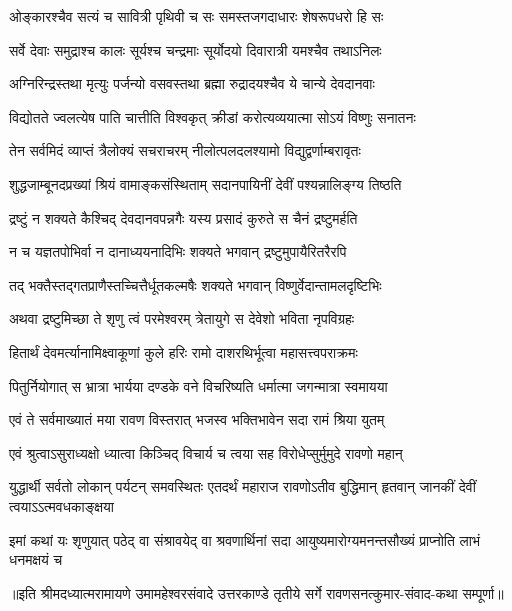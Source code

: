 \twolineshloka
{ओङ्कारश्चैव सत्यं च सावित्री पृथिवी च सः}
{समस्तजगदाधारः शेषरूपधरो हि सः} %

\twolineshloka
{सर्वे देवाः समुद्राश्च कालः सूर्यश्च चन्द्रमाः}
{सूर्योदयो दिवारात्री यमश्चैव तथाऽनिलः} %

\twolineshloka
{अग्निरिन्द्रस्तथा मृत्युः पर्जन्यो वसवस्तथा}
{ब्रह्मा रुद्रादयश्चैव ये चान्ये देवदानवाः} %

\twolineshloka
{विद्योतते ज्वलत्येष पाति चात्तीति विश्वकृत्}
{क्रीडां करोत्यव्ययात्मा सोऽयं विष्णुः सनातनः} %

\twolineshloka
{तेन सर्वमिदं व्याप्तं त्रैलोक्यं सचराचरम्}
{नीलोत्पलदलश्यामो विद्युद्वर्णाम्बरावृतः} %

\twolineshloka
{शुद्धजाम्बूनदप्रख्यां श्रियं वामाङ्कसंस्थिताम्}
{सदानपायिनीं देवीं पश्यन्नालिङ्ग्य तिष्ठति} %

\twolineshloka
{द्रष्टुं न शक्यते कैश्चिद् देवदानवपन्नगैः}
{यस्य प्रसादं कुरुते स चैनं द्रष्टुमर्हति} %

\twolineshloka
{न च यज्ञतपोभिर्वा न दानाध्ययनादिभिः}
{शक्यते भगवान् द्रष्टुमुपायैरितरैरपि} %

\twolineshloka
{तद् भक्तैस्तद्गतप्राणैस्तच्चित्तैर्धूतकल्मषैः}
{शक्यते भगवान् विष्णुर्वेदान्तामलदृष्टिभिः} %

\twolineshloka
{अथवा द्रष्टुमिच्छा ते शृणु त्वं परमेश्वरम्}
{त्रेतायुगे स देवेशो भविता नृपविग्रहः} %

\twolineshloka
{हितार्थं देवमर्त्यानामिक्ष्वाकूणां कुले हरिः}
{रामो दाशरथिर्भूत्वा महासत्त्वपराक्रमः} %

\twolineshloka
{पितुर्नियोगात् स भ्रात्रा भार्यया दण्डके वने}
{विचरिष्यति धर्मात्मा जगन्मात्रा स्वमायया} %

\twolineshloka
{एवं ते सर्वमाख्यातं मया रावण विस्तरात्}
{भजस्व भक्तिभावेन सदा रामं श्रिया युतम्} %


\twolineshloka
{एवं श्रुत्वाऽसुराध्यक्षो ध्यात्वा किञ्चिद् विचार्य च}
{त्वया सह विरोधेप्सुर्मुमुदे रावणो महान्} %

\threelineshloka
{युद्धार्थी सर्वतो लोकान् पर्यटन् समवस्थितः}
{एतदर्थं महाराज रावणोऽतीव बुद्धिमान्}
{हृतवान् जानकीं देवीं त्वयाऽऽत्मवधकाङ्क्षया} %

\fourlineindentedshloka
{इमां कथां यः शृणुयात् पठेद् वा}
{संश्रावयेद् वा श्रवणार्थिनां सदा}
{आयुष्यमारोग्यमनन्तसौख्यं}
{प्राप्नोति लाभं धनमक्षयं च} %


{॥इति श्रीमदध्यात्मरामायणे उमामहेश्वरसंवादे उत्तरकाण्डे तृतीये  सर्गे
रावणसनत्कुमार-संवाद-कथा सम्पूर्णा॥}
